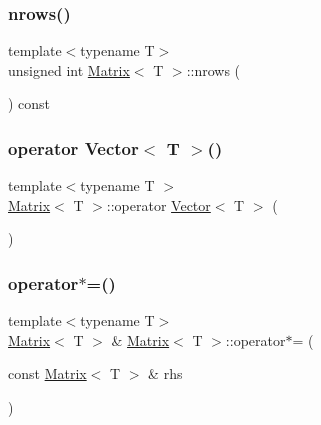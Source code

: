 \mbox{\label{classMatrix_ad025820349fa69f73f2da395af627741_ad025820349fa69f73f2da395af627741}} 
\subsubsection{\texorpdfstring{nrows()}{nrows()}}
{\footnotesize\ttfamily template$<$typename T$>$ \\
unsigned int \mbox{\hyperlink{classMatrix}{Matrix}}$<$ T $>$\+::nrows (\begin{DoxyParamCaption}{ }\end{DoxyParamCaption}) const\hspace{0.3cm}{\ttfamily [inline]}}

\mbox{\label{classMatrix_a8d390e8b2581c65774f58a0a3b716dcb_a8d390e8b2581c65774f58a0a3b716dcb}} 
\subsubsection{\texorpdfstring{operator Vector$<$ T $>$()}{operator Vector< T >()}}
{\footnotesize\ttfamily template$<$typename T $>$ \\
\mbox{\hyperlink{classMatrix}{Matrix}}$<$ T $>$\+::operator \mbox{\hyperlink{classVector}{Vector}}$<$ T $>$ (\begin{DoxyParamCaption}{ }\end{DoxyParamCaption})\hspace{0.3cm}{\ttfamily [inline]}}

\mbox{\label{classMatrix_af6a95588910fa9c53feaae71fe88df81_af6a95588910fa9c53feaae71fe88df81}} 
\subsubsection{\texorpdfstring{operator$\ast$=()}{operator*=()}\hspace{0.1cm}{\footnotesize\ttfamily [1/2]}}
{\footnotesize\ttfamily template$<$typename T$>$ \\
\mbox{\hyperlink{classMatrix}{Matrix}}$<$ T $>$ \& \mbox{\hyperlink{classMatrix}{Matrix}}$<$ T $>$\+::operator$\ast$= (\begin{DoxyParamCaption}\item[{const \mbox{\hyperlink{classMatrix}{Matrix}}$<$ T $>$ \&}]{rhs }\end{DoxyParamCaption})\hspace{0.3cm}{\ttfamily [inline]}}

